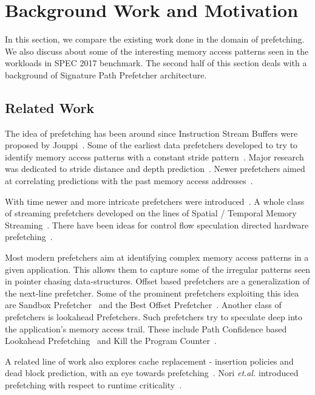 \section{Background Work and Motivation}
\label{Background}

In this section, we compare the existing work done in the domain of
prefetching.  We also discuss about some of the interesting memory
access patterns seen in the workloads in SPEC 2017 benchmark.  The
second half of this section deals with a background of Signature Path
Prefetcher architecture.

\subsection{Related Work}
\label{Background-Related}
The idea of prefetching has been around since Instruction Stream
Buffers were proposed by Jouppi~\cite{ISB}. Some of the earliest data
prefetchers developed to try to identify memory access patterns with a
constant stride pattern~\cite{Smith,Baer,Stride}. Major research was
dedicated to stride distance and depth prediction~\cite{Decoupled,Adaptive}. Newer prefetchers aimed at correlating
predictions with the past memory access addresses~\cite{Address_Correlated,AMPM}.

With time newer and more intricate prefetchers were
introduced~\cite{Wenisch_Temporal_Streaming,Stealth,Feedback_Directed,Coordinated,Bandwidth_Efficient,Pacman,TLB,Linearizing,Sandbox,VLDP,DoL,Domino}.
A whole class of streaming prefetchers developed on the lines of
Spatial / Temporal Memory
Streaming~\cite{Spatial_Pattern,SMS,Temporal_Instruction_Fetch,Off_Chip,STMS,SMS_JILP}.
There have been ideas for control flow speculation directed hardware prefetching~\cite{BFetch,MTBFetch}.

Most modern prefetchers aim at identifying complex memory access
patterns in a given application.  This allows them to capture some of
the irregular patterns seen in pointer chasing data-structures.
Offset based prefetchers are a generalization of the next-line
prefetcher.  Some of the prominent prefetchers exploiting this idea
are Sandbox Prefetcher~\cite{Sandbox} and the Best Offset Prefetcher~\cite{BOP}. 
Another class of prefetchers is lookahead Prefetchers.
Such prefetchers try to speculate deep into the application's memory
access trail.  These include Path Confidence based Lookahead
Prefetching~\cite{SPP} and Kill the Program Counter~\cite{KPC}.

A related line of work also explores cache replacement - insertion
policies and dead block prediction, with an eye towards
prefetching~\cite{DB_Pred,Cache_Burst,KPC,Harmony}.  Nori
\textit{et.al.} introduced prefetching with respect to runtime
criticality~\cite{CATCH}.

